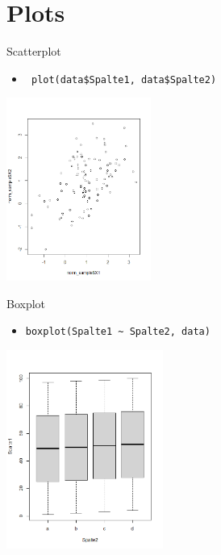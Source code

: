 \documentclass[xcolor=dvipsnames, aspectratio = 169]{beamer}
\begin{document}

\section{Plots}

\begin{frame}[fragile]{Scatterplot}
	\begin{itemize}
		\item \verb+ plot(data$Spalte1, data$Spalte2)+
	\end{itemize}
			
	\begin{center}
		\includegraphics[height=6cm]{Scatterplot}
	\end{center}
\end{frame}

\begin{frame}[fragile]{Boxplot}
	\begin{itemize}
		\item \verb+boxplot(Spalte1 ~ Spalte2, data)+
	\end{itemize}
			
	\begin{center}
		\includegraphics[height=6.5cm]{Boxplot}
	\end{center}
\end{frame}
\end{document}
